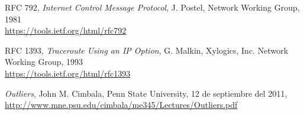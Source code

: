 \begin{thebibliography}{9}

	RFC 792,
	\textit{Internet Control Message Protocol},
	J. Postel,
  Network Working Group,
  1981 \\
	\url{https://tools.ietf.org/html/rfc792}


  RFC 1393,
  \textit{Traceroute Using an IP Option},
  G. Malkin, Xylogics, Inc.
  Network Working Group,
  1993 \\
  \url{https://tools.ietf.org/html/rfc1393}

	\textit{Outliers},
	John M. Cimbala,
	Penn State University,
	12 de septiembre del 2011, \\
	\url{http://www.mne.psu.edu/cimbala/me345/Lectures/Outliers.pdf}

\end{thebibliography}
